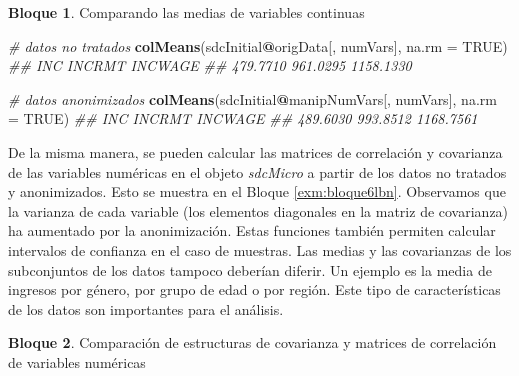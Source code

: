 \documentclass[]{book}
\newenvironment{Shaded}{\begin{snugshade}}{\end{snugshade}}
\newcommand{\CommentTok}[1]{\textcolor[rgb]{0.56,0.35,0.01}{\textit{#1}}}
\newcommand{\DataTypeTok}[1]{\textcolor[rgb]{0.13,0.29,0.53}{#1}}
\newcommand{\KeywordTok}[1]{\textcolor[rgb]{0.13,0.29,0.53}{\textbf{#1}}}
\newcommand{\NormalTok}[1]{#1}
\newcommand{\OperatorTok}[1]{\textcolor[rgb]{0.81,0.36,0.00}{\textbf{#1}}}
\newcommand{\OtherTok}[1]{\textcolor[rgb]{0.56,0.35,0.01}{#1}}
\theoremstyle{definition}
\theoremstyle{definition}
\newtheorem{example}{Bloque}[chapter]
\theoremstyle{definition}
\theoremstyle{definition}
\theoremstyle{remark}
\begin{document}
\begin{example}
\protect\hypertarget{exm:bloque5lbn}{}{\label{exm:bloque5lbn} }Comparando las medias de variables continuas
\end{example}

\begin{Shaded}
\begin{Highlighting}[]
\CommentTok{# datos no tratados}
\KeywordTok{colMeans}\NormalTok{(sdcInitial}\OperatorTok{@}\NormalTok{origData[, numVars], }\DataTypeTok{na.rm =} \OtherTok{TRUE}\NormalTok{)}
\CommentTok{##       INC    INCRMT   INCWAGE}
\CommentTok{##  479.7710  961.0295 1158.1330}

\CommentTok{# datos anonimizados}
\KeywordTok{colMeans}\NormalTok{(sdcInitial}\OperatorTok{@}\NormalTok{manipNumVars[, numVars], }\DataTypeTok{na.rm =} \OtherTok{TRUE}\NormalTok{)}
\CommentTok{##       INC    INCRMT   INCWAGE}
\CommentTok{##  489.6030  993.8512 1168.7561}
\end{Highlighting}
\end{Shaded}

De la misma manera, se pueden calcular las matrices de correlación y covarianza de las variables numéricas en el objeto \emph{sdcMicro} a partir de los datos no tratados y anonimizados. Esto se muestra en el Bloque \ref{exm:bloque6lbn}. Observamos que la varianza de cada variable (los elementos diagonales en la matriz de covarianza) ha aumentado por la anonimización. Estas funciones también permiten calcular intervalos de confianza en el caso de muestras. Las medias y las covarianzas de los subconjuntos de los datos tampoco deberían diferir. Un ejemplo es la media de ingresos por género, por grupo de edad o por región. Este tipo de características de los datos son importantes para el análisis.

\begin{example}
\protect\hypertarget{exm:bloque6lbn}{}{\label{exm:bloque6lbn} }Comparación de estructuras de covarianza y matrices de correlación de variables numéricas
\end{example}
\end{document}
